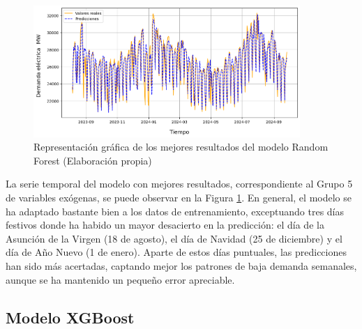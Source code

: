 \documentclass[12pt,a4paper]{report}
\begin{document}
\begin{figure}[H]
    \centering
    \includegraphics[width=0.9\textwidth]{Images/tfm-4.3(randomforest).png}
    \caption{Representación gráfica de los mejores resultados del modelo Random Forest (Elaboración propia) }
    \label{fig:figura_RM}
\end{figure}

La serie temporal del modelo con mejores resultados, correspondiente al Grupo 5 de variables exógenas, se puede observar en la Figura \ref{fig:figura_RM}. En general, el modelo se ha adaptado bastante bien a los datos de entrenamiento, exceptuando tres días festivos donde ha habido un mayor desacierto en la predicción: el día de la Asunción de la Virgen (18 de agosto), el día de Navidad (25 de diciembre) y el día de Año Nuevo (1 de enero). Aparte de estos días puntuales, las predicciones han sido más acertadas, captando mejor los patrones de baja demanda semanales, aunque se ha mantenido un pequeño error apreciable.

\subsection{Modelo XGBoost}
\end{document}
